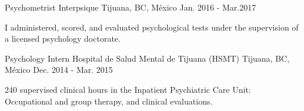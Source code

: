 \vspace{-3mm}
\begin{cventries}
    \cventry
        {Psychometrist}
        {Interpsique}
        {Tijuana, BC, México}
        {Jan. 2016 - Mar.2017}
        {
            \begin{cvitems}
                \item {I administered, scored, and evaluated psychological tests under the supervision of a licensed psychology doctorate.}
            \end{cvitems}
        }
    \cventry
        {Psychology Intern}
        {Hospital de Salud Mental de Tijuana (HSMT)}
        {Tijuana, BC, México}
        {Dec. 2014 - Mar. 2015}
        {
            \begin{cvitems}
                \item {240 supervised clinical hours in the Inpatient
                    Psychiatric Care Unit: Occupational and group therapy, and
                clinical evaluations.}
            \end{cvitems}
        }
\end{cventries}
